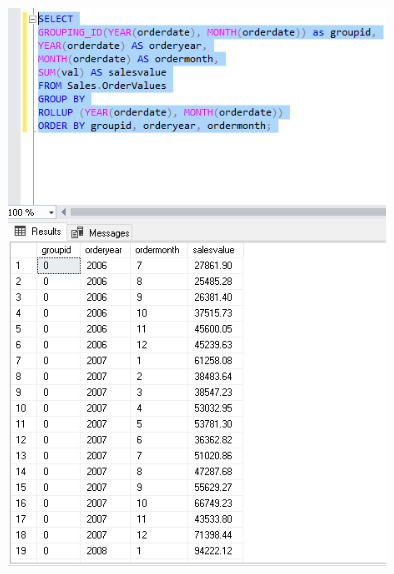 \begin{flushleft}
\begin{center}
	\includegraphics[width=10cm]{./Imagenes/6img8} 
	\end{center}
\textbf{}\\
\textbf{}\\








\end{flushleft}